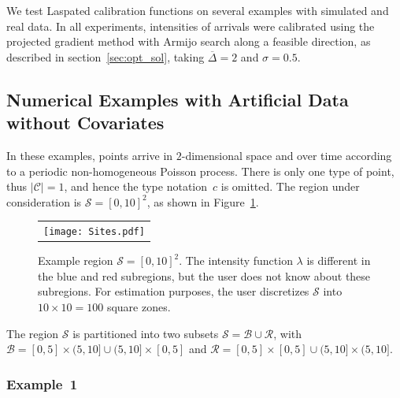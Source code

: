 \documentclass[article]{jss}
\begin{document}
We test Laspated calibration functions
on several examples with simulated and real data.
In all experiments, intensities of arrivals were calibrated using the projected gradient method with Armijo search along a feasible direction, as described in section~\ref{sec:opt_sol}, taking $\overline \Delta=2$ and $\sigma=0.5$.

\subsection{Numerical Examples with Artificial Data without Covariates}\label{sec:simulated_example}
In these examples, points arrive in $2$-dimensional space and over time according to a periodic non-homogeneous Poisson process.
There is only one type of point, thus $|\mathcal{C}| = 1$, and hence the type notation~$c$ is omitted.
The region under consideration is $\mathcal{S} = [0,10]^2$, as shown in Figure~\ref{figureserr}. 

\begin{figure}
\centering
\begin{tabular}{c}
\texttt{[image: Sites.pdf]}
\end{tabular}
\caption{\label{figureserr}
Example region $\mathcal{S} = [0,10]^2$.
The intensity function $\lambda$ is different in the blue and red subregions, but the user does not know about these subregions.
For estimation purposes, the user discretizes $\mathcal{S}$ into $10 \times 10 = 100$ square zones.
}
\end{figure}

The region $\mathcal{S}$ is partitioned into two subsets $\mathcal{S} = \mathcal{B} \cup \mathcal{R}$, with $\mathcal{B} = [0,5] \times (5,10] \cup (5,10] \times [0,5]$ and $\mathcal{R} = [0,5] \times [0,5] \cup (5,10] \times (5,10]$.





\subsubsection{Example~1}
\label{sec:example 1}
\end{document}
